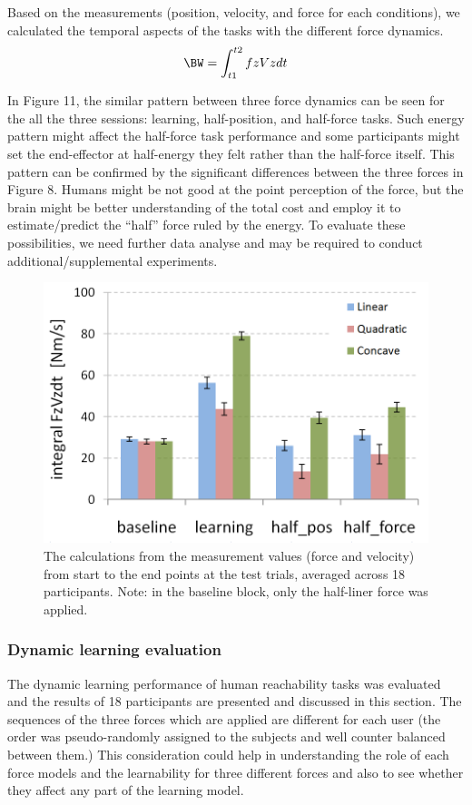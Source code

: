 Based on the measurements (position, velocity, and force for each conditions), we calculated the temporal aspects of the tasks with the different force dynamics.
%
\begin{equation}
  \BW = \int_{t1}^{t2} fz Vz dt
\end{equation}
%

In Figure 11, the similar pattern between three force dynamics can be seen for the all the three sessions: learning, half-position, and half-force tasks. Such energy pattern might affect the half-force task performance and some participants might set the end-effector at half-energy they felt rather than the half-force itself. This pattern can be confirmed by the significant differences between the three forces in Figure 8. Humans might be not good at the point perception of the force, but the brain might be better understanding of the total cost and employ it to estimate/predict the “half” force ruled by the energy. To evaluate these possibilities, we need further data analyse and may be required to conduct additional/supplemental experiments.
%
\begin{figure}
  \centering
  \includegraphics[scale=0.5]{Chie/figs/Figure11.png}
  \caption{The calculations from the measurement values (force and velocity) from start to the end points at the test trials, averaged across 18 participants.  Note: in the baseline block, only the half-liner force was applied.}
  \label{forcevel}
\end{figure}
\subsubsection{Dynamic learning evaluation}
The dynamic learning performance of human reachability tasks was evaluated and the results of 18 participants are presented and discussed in this section. The sequences of the three forces which are applied are different for each user (the order was pseudo-randomly assigned to the subjects and well counter balanced between them.) This consideration could help in understanding the role of each force models and the learnability for three different forces and also to see whether they affect any part of the learning model.

